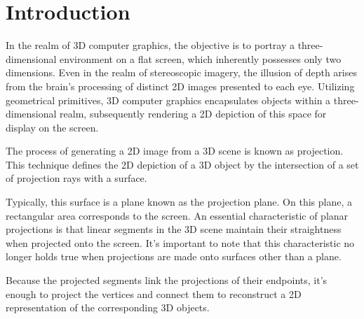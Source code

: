 \section{Introduction}

In the realm of 3D computer graphics, the objective is to portray a three-dimensional environment on a flat screen, which inherently possesses only two dimensions. 
Even in the realm of stereoscopic imagery, the illusion of depth arises from the brain's processing of distinct 2D images presented to each eye. 
Utilizing geometrical primitives, 3D computer graphics encapsulates objects within a three-dimensional realm, subsequently rendering a 2D depiction of this space for display on the screen.

The process of generating a 2D image from a 3D scene is known as projection. 
This technique defines the 2D depiction of a 3D object by the intersection of a set of projection rays with a surface.

Typically, this surface is a plane known as the projection plane. On this plane, a rectangular area corresponds to the screen.
An essential characteristic of planar projections is that linear segments in the 3D scene maintain their straightness when projected onto the screen.
It's important to note that this characteristic no longer holds true when projections are made onto surfaces other than a plane.

Because the projected segments link the projections of their endpoints, it's enough to project the vertices and connect them to reconstruct a 2D representation of the corresponding 3D objects.

